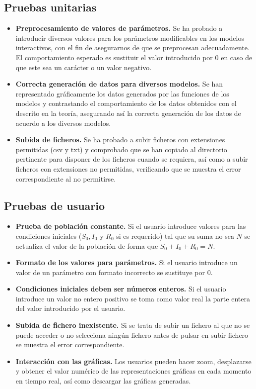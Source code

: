 \subsection{Pruebas unitarias}

\begin{itemize}
\item \textbf{Preprocesamiento de valores de parámetros.} Se ha probado a introducir diversos valores para los parámetros modificables en los modelos interactivos, con el fin de asegurarnos de que se preprocesan adecuadamente. El comportamiento esperado es sustituir el valor introducido por $0$ en caso de que este sea un carácter o un valor negativo.
\item \textbf{Correcta generación de datos para diversos modelos.} Se han representado gráficamente los datos generados por las funciones de los modelos y contrastando el comportamiento de los datos obtenidos con el descrito en la teoría, asegurando así la correcta generación de los datos de acuerdo a los diversos modelos.
\item \textbf{Subida de ficheros.} Se ha probado a subir ficheros con extensiones permitidas (csv y txt) y comprobado que se han copiado al directorio pertinente para disponer de los ficheros cuando se requiera, así como a subir ficheros con extensiones no permitidas, verificando que se muestra el error correspondiente al no permitirse.
\end{itemize}

\subsection{Pruebas de usuario}

\begin{itemize}
\item \textbf{Prueba de población constante.} Si el usuario introduce valores para las condiciones iniciales ($S_0, I_0$ y $R_0$ si es requerido) tal que su suma no sea $N$ se actualiza el valor de la población de forma que $S_0+I_0+R_0=N$.
\item \textbf{Formato de los valores para parámetros.} Si el usuario introduce un valor de un parámetro con formato incorrecto se sustituye por $0$.
\item \textbf{Condiciones iniciales deben ser números enteros.} Si el usuario introduce un valor no entero positivo se toma como valor real la parte entera del valor introducido por el usuario.
\item \textbf{Subida de fichero inexistente.} Si se trata de subir un fichero al que no se puede acceder o no selecciona ningún fichero antes de pulsar en subir fichero se muestra el error correspondiente.
\item \textbf{Interacción con las gráficas.} Los usuarios pueden hacer zoom, desplazarse y obtener el valor numérico de las representaciones gráficas en cada momento en tiempo real, así como descargar las gráficas generadas.
\end{itemize}

